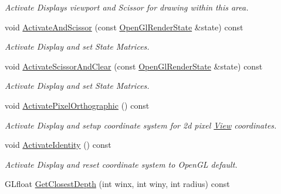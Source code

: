 \begin{DoxyCompactItemize}
\begin{DoxyCompactList}\small\item\em Activate Displays viewport and Scissor for drawing within this area. \end{DoxyCompactList}\item 
void \hyperlink{structpangolin_1_1_view_a105adf189a17636f2e2465f6e3520bac}{Activate\+And\+Scissor} (const \hyperlink{classpangolin_1_1_open_gl_render_state}{Open\+Gl\+Render\+State} \&state) const \hypertarget{structpangolin_1_1_view_a105adf189a17636f2e2465f6e3520bac}{}\label{structpangolin_1_1_view_a105adf189a17636f2e2465f6e3520bac}

\begin{DoxyCompactList}\small\item\em Activate Display and set State Matrices. \end{DoxyCompactList}\item 
void \hyperlink{structpangolin_1_1_view_ab8bf1ff3b034cdd6a3ee058bc62e29c0}{Activate\+Scissor\+And\+Clear} (const \hyperlink{classpangolin_1_1_open_gl_render_state}{Open\+Gl\+Render\+State} \&state) const \hypertarget{structpangolin_1_1_view_ab8bf1ff3b034cdd6a3ee058bc62e29c0}{}\label{structpangolin_1_1_view_ab8bf1ff3b034cdd6a3ee058bc62e29c0}

\begin{DoxyCompactList}\small\item\em Activate Display and set State Matrices. \end{DoxyCompactList}\item 
void \hyperlink{structpangolin_1_1_view_a9f1c4b42b919065393ec4389b69e73ce}{Activate\+Pixel\+Orthographic} () const \hypertarget{structpangolin_1_1_view_a9f1c4b42b919065393ec4389b69e73ce}{}\label{structpangolin_1_1_view_a9f1c4b42b919065393ec4389b69e73ce}

\begin{DoxyCompactList}\small\item\em Activate Display and setup coordinate system for 2d pixel \hyperlink{structpangolin_1_1_view}{View} coordinates. \end{DoxyCompactList}\item 
void \hyperlink{structpangolin_1_1_view_a64cc0f6d644da9253ed7a9f18d60281d}{Activate\+Identity} () const \hypertarget{structpangolin_1_1_view_a64cc0f6d644da9253ed7a9f18d60281d}{}\label{structpangolin_1_1_view_a64cc0f6d644da9253ed7a9f18d60281d}

\begin{DoxyCompactList}\small\item\em Activate Display and reset coordinate system to Open\+GL default. \end{DoxyCompactList}\item 
G\+Lfloat \hyperlink{structpangolin_1_1_view_a77bcced04b7d4ed936738adc330b2836}{Get\+Closest\+Depth} (int winx, int winy, int radius) const \hypertarget{structpangolin_1_1_view_a77bcced04b7d4ed936738adc330b2836}{}\label{structpangolin_1_1_view_a77bcced04b7d4ed936738adc330b2836}


\end{DoxyCompactItemize}
